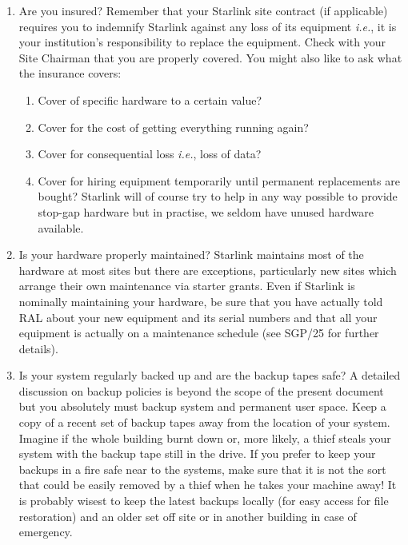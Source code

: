 \documentclass[11pt]{article}
\newcommand{\xref}[3]{#1}
\begin{document}
\begin{enumerate}

\item Are you insured? Remember that your Starlink site contract (if
applicable) requires you to indemnify Starlink against any loss of
its equipment \emph{i.e.}, it is your institution's responsibility to
replace the equipment. Check with your Site Chairman that you are
properly covered.  You might also like to ask what the insurance
covers:

\begin{enumerate}

\item Cover of specific hardware to a certain value?

\item Cover for the cost of getting everything running again?

\item Cover for consequential loss \emph{i.e.}, loss of data?

\item Cover for hiring equipment temporarily until permanent replacements
are bought? Starlink will of course try to help in any way possible to 
provide stop-gap hardware but in practise, we seldom have unused hardware
available.

\end{enumerate}

\item Is your hardware properly maintained? Starlink maintains most of
the hardware at most sites but there are exceptions, particularly
new sites which arrange their own maintenance via starter grants. 
Even if Starlink is nominally maintaining your hardware, be sure that
you have actually told RAL about your new equipment and its serial numbers
and that all your equipment is actually on a maintenance schedule 
(see \xref{SGP/25}{sgp25}{} for further details). 


\item Is your system regularly backed up and are the backup tapes
safe?  A detailed discussion on backup policies is beyond the scope of
the present document but you absolutely must backup
system and permanent user space. Keep a copy of a recent set of backup
tapes away from the location of your system. Imagine if the whole
building burnt down or, more likely, a thief steals your system with
the backup tape still in the drive. If you prefer to keep your backups
in a fire safe near to the systems, make sure that it is not the sort
that could be easily removed by a thief when he takes your machine away!
It is probably wisest to keep the latest backups locally (for easy access
for file restoration) and an older set off site or in another building
in case of emergency.


\end{enumerate}
\end{document}
